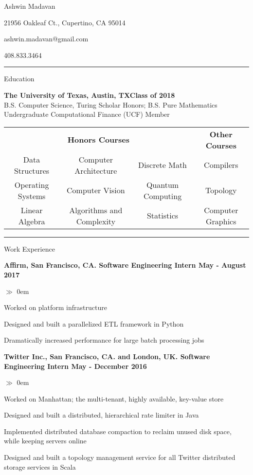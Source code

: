 \documentclass{article}
\begin{document}

\centerline{\LARGE \sc Ashwin Madavan}
\centerline{21956 Oakleaf Ct., Cupertino, CA 95014}
\centerline{ashwin.madavan@gmail.com}
\centerline{408.833.3464}
\medskip\hrule\medskip

\centerline{\large \sc Education}\smallskip 
\noindent\textbf{The University of Texas, Austin, TX\hfill{Class of 2018}} \\
B.S. Computer Science, Turing Scholar Honors; B.S. Pure Mathematics \\
Undergraduate Computational Finance (UCF) Member

\begin{center}
\begin{tabular}{ c c c c }
\multicolumn{3}{c}{\textbf{Honors Courses}} & \multicolumn{1}{c}{\textbf{Other Courses}} \\
Data Structures & Computer Architecture & Discrete Math & Compilers \\
Operating Systems & Computer Vision & Quantum Computing & Topology \\
Linear Algebra & Algorithms and Complexity & Statistics & Computer Graphics \\

\end{tabular}
\end{center}

\hrule\medskip
\centerline{\large \sc Work Experience} \smallskip
\noindent\textbf{Affirm, San Francisco, CA. Software Engineering Intern
\hfill{May - August 2017}}
\begin{list}{$\gg$}{}  
  \itemsep0em
  \item Worked on platform infrastructure
  \item Designed and built a parallelized ETL framework in Python
  \item Dramatically increased performance for large batch processing jobs
\end{list}

\noindent\textbf{Twitter Inc., San Francisco, CA. and London, UK. Software Engineering Intern
\hfill{May - December 2016}}
\begin{list}{$\gg$}{}  
  \itemsep0em
  \item Worked on Manhattan; the multi-tenant, highly available, key-value store
  \item Designed and built a distributed, hierarchical rate limiter in Java
  \item Implemented distributed database compaction to reclaim unused disk space, while keeping servers online
  \item Designed and built a topology management service for all Twitter distributed storage services in Scala
\end{list}
\end{document}
